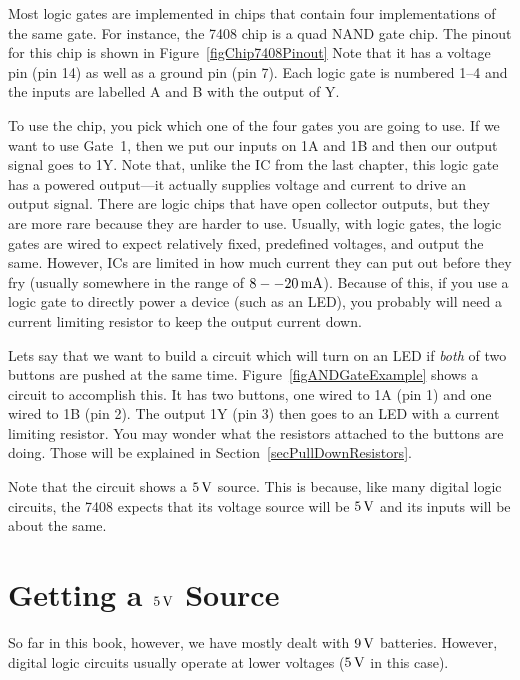 
Most logic gates are implemented in chips that contain four implementations of the same gate.
For instance, the 7408 chip is a quad NAND gate chip.
The pinout for this chip is shown in Figure~\ref{figChip7408Pinout}
Note that it has a voltage pin (pin 14) as well as a ground pin (pin 7).
Each logic gate is numbered 1--4 and the inputs are labelled A and B with the output of Y.

To use the chip, you pick which one of the four gates you are going to use.
If we want to use Gate~1, then we put our inputs on 1A and 1B and then our output signal goes to 1Y.
Note that, unlike the IC from the last chapter, this logic gate has a powered output---it actually supplies voltage and current to drive an output signal.
There are logic chips that have open collector outputs, but they are more rare because they are harder to use.
Usually, with logic gates, the logic gates are wired to expect relatively fixed, predefined voltages, and output the same.
However, ICs are limited in how much current they can put out before they fry (usually somewhere in the range of $8--20\,\si{\milli\ampere}$).
Because of this, if you use a logic gate to directly power a device (such as an LED), you probably will need a current limiting resistor to keep the output current down.


Lets say that we want to build a circuit which will turn on an LED if \emph{both} of two buttons are pushed at the same time.
Figure~\ref{figANDGateExample} shows a circuit to accomplish this.
It has two buttons, one wired to 1A (pin 1) and one wired to 1B (pin 2).
The output 1Y (pin 3) then goes to an LED with a current limiting resistor.
You may wonder what the resistors attached to the buttons are doing.
Those will be explained in Section~\ref{secPullDownResistors}.

Note that the circuit shows a $5\,\si{\volt}$ source.
This is because, like many digital logic circuits, the 7408 expects that its voltage source will be $5\,\si{\volt}$ and its inputs will be about the same.

\section{Getting a $5\,\si{\volt}$ Source}

So far in this book, however, we have mostly dealt with $9\,\si{\volt}$ batteries.
However, digital logic circuits usually operate at lower voltages ($5\,\si{\volt}$ in this case).

